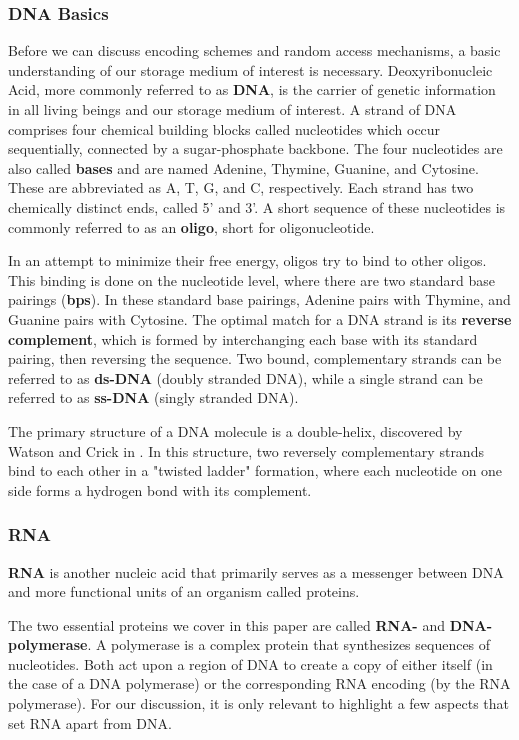 \documentclass[a4paper,conference]{IEEEtran}
\begin{document}
\subsubsection{DNA Basics}
Before we can discuss encoding schemes and random access mechanisms, a basic understanding of our storage medium of interest is necessary. Deoxyribonucleic Acid, more commonly referred to as \textbf{DNA}, is the carrier of genetic information in all living beings and our storage medium of interest. A strand of DNA comprises four chemical building blocks called nucleotides which occur sequentially, connected by a sugar-phosphate backbone. The four nucleotides are also called \textbf{bases} and are named Adenine, Thymine, Guanine, and Cytosine. These are abbreviated as A, T, G, and C, respectively. Each strand has two chemically distinct ends, called 5' and 3'. A short sequence of these nucleotides is commonly referred to as an \textbf{oligo}, short for oligonucleotide.

In an attempt to minimize their free energy, oligos try to bind to other oligos. This binding is done on the nucleotide level, where there are two standard base pairings (\textbf{bps}). In these standard base pairings, Adenine pairs with Thymine, and Guanine pairs with Cytosine. The optimal match for a DNA strand is its \textbf{reverse complement}, which is formed by interchanging each base with its standard pairing, then reversing the sequence. Two bound, complementary strands can be referred to as \textbf{ds-DNA} (doubly stranded DNA), while a single strand can be referred to as \textbf{ss-DNA} (singly stranded DNA).

The primary structure of a DNA molecule is a double-helix, discovered by Watson and Crick in \cite{doublehelix}. In this structure, two reversely complementary strands bind to each other in a "twisted ladder" formation, where each nucleotide on one side forms a hydrogen bond with its complement.

\subsubsection{RNA}

\textbf{RNA} is another nucleic acid that primarily serves as a messenger between DNA and more functional units of an organism called proteins.

The two essential proteins we cover in this paper are called \textbf{RNA-} and \textbf{DNA-polymerase}. A polymerase is a complex protein that synthesizes sequences of nucleotides. Both act upon a region of DNA to create a copy of either itself (in the case of a DNA polymerase) or the corresponding RNA encoding (by the RNA polymerase). For our discussion, it is only relevant to highlight a few aspects that set RNA apart from DNA.
\end{document}
